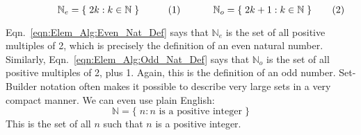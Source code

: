 \documentclass[crop=false,class=book,oneside]{standalone}                      %
\begin{document}
            \begin{subequations}
                \begin{minipage}{0.49\textwidth}
                    \centering
                    \begin{equation}
                        \label{eqn:Elem_Alg:Even_Nat_Def}
                        \mathbb{N}_{e}=\{\;2k:k\in\mathbb{N}\;\}
                    \end{equation}
                \end{minipage}
                \hfill
                \begin{minipage}{0.49\textwidth}
                    \centering
                    \begin{equation}
                        \label{eqn:Elem_Alg:Odd_Nat_Def}
                        \mathbb{N}_{o}=\{\;2k+1:k\in\mathbb{N}\;\}
                    \end{equation}
                \end{minipage}
            \end{subequations}
            \par\vspace{2.5ex}
            Eqn.~\ref{eqn:Elem_Alg:Even_Nat_Def} says that
            $\mathbb{N}_{e}$ is the set of all positive
            multiples of 2, which is precisely the
            definition of an even natural number.
            Similarly, Eqn.~\ref{eqn:Elem_Alg:Odd_Nat_Def}
            says that $\mathbb{N}_{o}$ is the set of all
            positive multiples of 2, plus 1. Again, this is
            the definition of an odd number. Set-Builder
            notation often makes it possible to describe
            very large sets in a very compact manner.
            We can even use plain English:
            \begin{equation}
                \mathbb{N}=\{\;n:n\textrm{ is a positive integer}\;\}
            \end{equation}
            This is the set of all $n$ such that $n$ is a
            positive integer.
\end{document}
